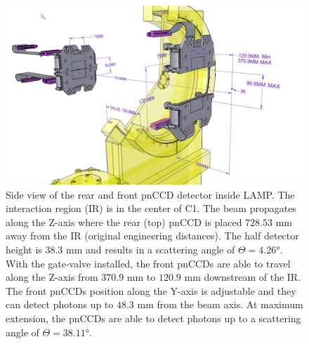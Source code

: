 \begin{figure}
	\centering
		\includegraphics[width=1.0\textwidth]{images/pnCCD-dimensions.jpg}
	\caption[Rear and front pnCCD detector geometry in the LAMP instrument.]{Side view of the rear and front pnCCD detector inside LAMP. The interaction region (IR) is in the center of C1. The beam propagates along the Z-axis where the rear (top) pnCCD is placed $728.53$ mm away from the IR (original engineering distances). The half detector height is $38.3$ mm and results in a scattering angle of $\Theta = 4.26$°. With the gate-valve installed, the front pnCCDs are able to travel along the Z-axis from $370.9$ mm to $120.9$ mm downstream of the IR. The front pnCCDs position along the Y-axis is adjustable and they can detect photons up to $48.3$ mm from the beam axis. At maximum extension, the pnCCDs are able to detect photons up to a scattering angle of $\Theta=38.11$°.}
	\label{fig:pnCCD-dimensions}
\end{figure}
